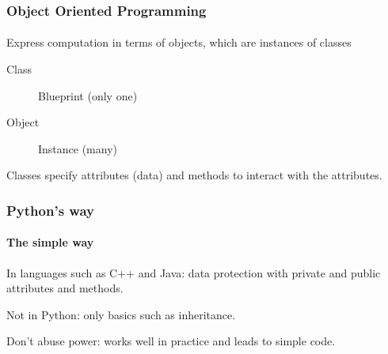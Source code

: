 






\begin{frame}\frametitle{Object Oriented Programming}
    \framesubtitle{}

    Express computation in terms of objects, which are instances of classes
    \begin{description}
        \item[Class] Blueprint (only one)
        \item[Object] Instance (many)
    \end{description}

    \pause\vfill

    Classes specify attributes (data) and methods to interact with the
    attributes.

\end{frame}

\begin{frame}\frametitle{Python's way}
    \framesubtitle{The simple way}

    In languages such as C++ and Java: data protection with
    private and public attributes and methods.

    \vfill

    Not in Python: only basics such as inheritance.

    \vfill

    Don't abuse power: works well in practice and leads
    to simple code.
\end{frame}

